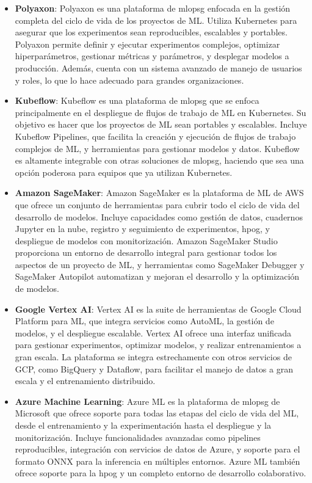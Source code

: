 \begin{itemize}
    \item \textbf{Polyaxon}: Polyaxon es una plataforma de \Gls{mlopsg} enfocada en la gestión completa del ciclo de vida de los proyectos de ML. Utiliza Kubernetes para asegurar que los experimentos sean reproducibles, escalables y portables. Polyaxon permite definir y ejecutar experimentos complejos, optimizar hiperparámetros, gestionar métricas y parámetros, y desplegar modelos a producción. Además, cuenta con un sistema avanzado de manejo de usuarios y roles, lo que lo hace adecuado para grandes organizaciones.

    \item \textbf{Kubeflow}: Kubeflow es una plataforma de \Gls{mlopsg} que se enfoca principalmente en el despliegue de flujos de trabajo de ML en Kubernetes. Su objetivo es hacer que los proyectos de ML sean portables y escalables. Incluye Kubeflow Pipelines, que facilita la creación y ejecución de flujos de trabajo complejos de ML, y herramientas para gestionar modelos y datos. Kubeflow es altamente integrable con otras soluciones de \Gls{mlopsg}, haciendo que sea una opción poderosa para equipos que ya utilizan Kubernetes.

    \item \textbf{Amazon SageMaker}: Amazon SageMaker es la plataforma de ML de AWS que ofrece un conjunto de herramientas para cubrir todo el ciclo de vida del desarrollo de modelos. Incluye capacidades como gestión de datos, cuadernos Jupyter en la nube, registro y seguimiento de experimentos, \gls{hpog}, y despliegue de modelos con monitorización. Amazon SageMaker Studio proporciona un entorno de desarrollo integral para gestionar todos los aspectos de un proyecto de ML, y herramientas como SageMaker Debugger y SageMaker Autopilot automatizan y mejoran el desarrollo y la optimización de modelos.

    \item \textbf{Google Vertex AI}: Vertex AI es la suite de herramientas de Google Cloud Platform para ML, que integra servicios como AutoML, la gestión de modelos, y el despliegue escalable. Vertex AI ofrece una interfaz unificada para gestionar experimentos, optimizar modelos, y realizar entrenamientos a gran escala. La plataforma se integra estrechamente con otros servicios de GCP, como BigQuery y Dataflow, para facilitar el manejo de datos a gran escala y el entrenamiento distribuido.

    \item \textbf{Azure Machine Learning}: Azure ML es la plataforma de \Gls{mlopsg} de Microsoft que ofrece soporte para todas las etapas del ciclo de vida del ML, desde el entrenamiento y la experimentación hasta el despliegue y la monitorización. Incluye funcionalidades avanzadas como pipelines reproducibles, integración con servicios de datos de Azure, y soporte para el formato ONNX para la inferencia en múltiples entornos. Azure ML también ofrece soporte para la \gls{hpog} y un completo entorno de desarrollo colaborativo.


\end{itemize}
